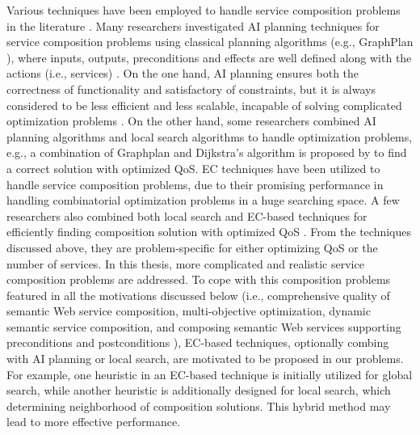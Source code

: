 Various techniques have been employed to handle service composition problems in the literature \cite{feng2013dynamic,markou2015non,parejo2008qos,peer2005web,qi2010combining,wang2014automated}. Many researchers investigated AI planning techniques for service composition problems using classical planning algorithms (e.g., GraphPlan \cite{blum1997fast}), where inputs, outputs, preconditions and effects are well defined along with the actions (i.e., services) \cite{markou2015non,peer2005web}. On the one hand, AI planning ensures both the correctness of functionality and satisfactory of constraints, but it is always considered to be less efficient and less scalable, incapable of solving complicated optimization problems \cite{parejo2008qos}. On the other hand, some researchers combined AI planning algorithms and local search algorithms to handle optimization problems, e.g., a combination of Graphplan and Dijkstra’s algorithm is proposed by \cite{feng2013dynamic} to find a correct solution with optimized QoS. EC techniques have been utilized to handle service composition problems, due to their promising performance in handling combinatorial optimization problems in a huge searching space. A few researchers also combined both local search and EC-based techniques for efficiently finding composition solution with optimized QoS \cite{da2016memetic,parejo2008qos}. From the techniques discussed above, they are problem-specific for either optimizing QoS or the number of services. In this thesis, more complicated and realistic service composition problems are addressed. To cope with this composition problems featured in all the motivations discussed below (i.e., comprehensive quality of semantic Web service composition, multi-objective optimization, dynamic semantic service composition, and composing semantic Web services supporting preconditions and postconditions ), EC-based techniques, optionally combing with AI planning or local search, are motivated to be proposed in our problems. For example, one heuristic in an EC-based technique is initially utilized for global search, while another heuristic is additionally designed for local search, which determining neighborhood of composition solutions. This hybrid method may lead to more effective performance.

